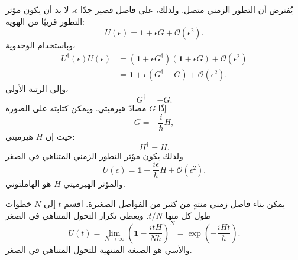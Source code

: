 يُفترض أن التطور الزمني متصل. ولذلك، على فاصل قصير جدًا \(\epsilon\)، لا بد أن يكون مؤثر التطور قريبًا من الهوية:
\begin{equation}
U(\epsilon)=\mathbf 1+\epsilon G+\mathcal O(\epsilon^2).
\end{equation}
وباستخدام الوحدوية،
\begin{align}
U^\dagger(\epsilon)U(\epsilon)
&=
\left(\mathbf 1+\epsilon G^\dagger\right)
\left(\mathbf 1+\epsilon G\right)
+\mathcal O(\epsilon^2)
\\
&=
\mathbf 1+\epsilon(G^\dagger+G)
+\mathcal O(\epsilon^2).
\end{align}
وإلى الرتبة الأولى،
\begin{equation}
G^\dagger=-G.
\end{equation}
إذًا \(G\) مضادّ هيرميتي. ويمكن كتابته على الصورة
\begin{equation}
G=-\frac{i}{\hbar}H,
\end{equation}
حيث إن \(H\) هيرميتي:
\begin{equation}
H^\dagger=H.
\end{equation}
ولذلك يكون مؤثر التطور الزمني المتناهي في الصغر
\begin{equation}
U(\epsilon)
=
\mathbf 1-\frac{i\epsilon}{\hbar}H
+\mathcal O(\epsilon^2).
\end{equation}
والمؤثر الهيرميتي \(H\) هو الهاملتوني.

\begin{classroomqa}
\end{classroomqa}

يمكن بناء فاصل زمني منتهٍ من كثير من الفواصل الصغيرة. اقسم \(t\) إلى \(N\) خطوات طول كل منها \(t/N\). ويعطي تكرار التحول المتناهي في الصغر
\begin{equation}
U(t)
=
\lim_{N\to\infty}
\left(
\mathbf 1-\frac{itH}{N\hbar}
\right)^N
=
\exp\left(-\frac{iHt}{\hbar}\right).
\end{equation}
والأسي هو الصيغة المنتهية للتحول المتناهي في الصغر.

